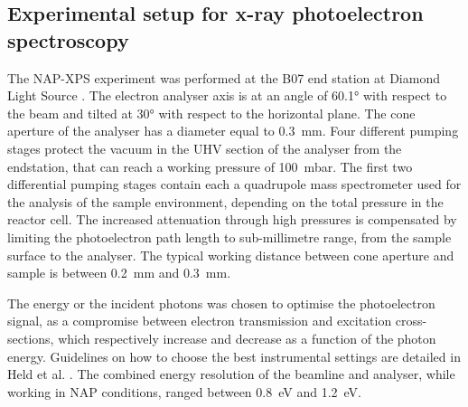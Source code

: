 \subsection{Experimental setup for x-ray photoelectron spectroscopy} \label{sec:XPS111}

The NAP-XPS experiment was performed at the B07 end station at Diamond Light Source \parencite{Held2020}.
The electron analyser axis is at an angle of \ang{60.1} with respect to the beam and tilted at \ang{30} with respect to the horizontal plane.
The cone aperture of the analyser has a diameter equal to \qty{0.3}{\mm}.
Four different pumping stages protect the vacuum in the UHV section of the analyser from the endstation, that can reach a working pressure of \qty{100}{\milli\bar}.
The ﬁrst two differential pumping stages contain each a quadrupole mass spectrometer used for the analysis of the sample environment, depending on the total pressure in the reactor cell.
The increased attenuation through high pressures is compensated by limiting the photoelectron path length to sub-millimetre range, from the sample surface to the analyser.
The typical working distance between cone aperture and sample is between \qty{0.2}{\mm} and \qty{0.3}{\mm}.

The energy or the incident photons was chosen to optimise the photoelectron signal, as a compromise between electron transmission and excitation cross-sections, which respectively increase and decrease as a function of the photon energy.
Guidelines on how to choose the best instrumental settings are detailed in Held et al. \parencite*{Held2020}.
The combined energy resolution of the beamline and analyser, while working in NAP conditions, ranged between \qty{0.8}{\eV} and \qty{1.2}{\eV}.